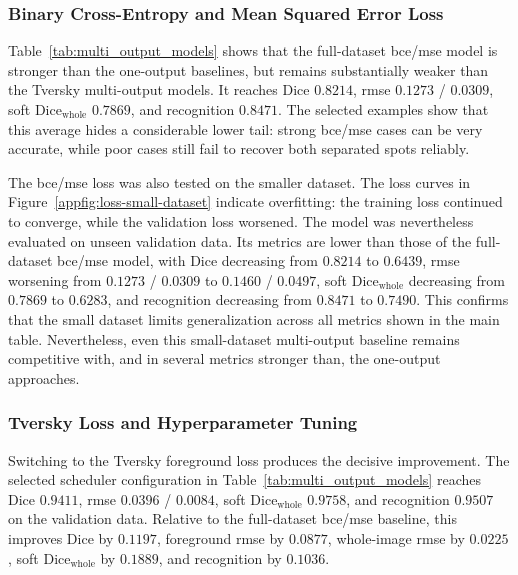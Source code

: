 \subsubsection{Binary Cross-Entropy and Mean Squared Error Loss}

Table~\ref{tab:multi_output_models} shows that the full-dataset \gls{bce}/\gls{mse} model is stronger than the one-output baselines, but remains substantially weaker than the Tversky multi-output models. It reaches Dice $0.8214$, \gls{rmse} $0.1273$ / $0.0309$, soft Dice$_{\mathrm{whole}}$ $0.7869$, and recognition $0.8471$. The selected examples show that this average hides a considerable lower tail: strong \gls{bce}/\gls{mse} cases can be very accurate, while poor cases still fail to recover both separated spots reliably.

The \gls{bce}/\gls{mse} loss was also tested on the smaller dataset. The loss curves in Figure~\ref{appfig:loss-small-dataset} indicate overfitting: the training loss continued to converge, while the validation loss worsened. The model was nevertheless evaluated on unseen validation data. Its metrics are lower than those of the full-dataset \gls{bce}/\gls{mse} model, with Dice decreasing from $0.8214$ to $0.6439$, \gls{rmse} worsening from $0.1273$ / $0.0309$ to $0.1460$ / $0.0497$, soft Dice$_{\mathrm{whole}}$ decreasing from $0.7869$ to $0.6283$, and recognition decreasing from $0.8471$ to $0.7490$. This confirms that the small dataset limits generalization across all metrics shown in the main table. Nevertheless, even this small-dataset multi-output baseline remains competitive with, and in several metrics stronger than, the one-output approaches.

\subsubsection{Tversky Loss and Hyperparameter Tuning}

Switching to the Tversky foreground loss produces the decisive improvement. The selected scheduler configuration in Table~\ref{tab:multi_output_models} reaches Dice $0.9411$, \gls{rmse} $0.0396$ / $0.0084$, soft Dice$_{\mathrm{whole}}$ $0.9758$, and recognition $0.9507$ on the validation data. Relative to the full-dataset \gls{bce}/\gls{mse} baseline, this improves Dice by $0.1197$, foreground \gls{rmse} by $0.0877$, whole-image \gls{rmse} by $0.0225$, soft Dice$_{\mathrm{whole}}$ by $0.1889$, and recognition by $0.1036$.

